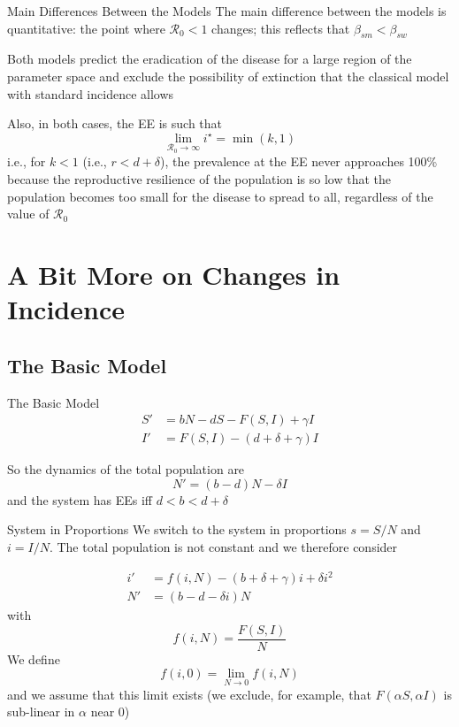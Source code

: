 \documentclass[aspectratio=169]{beamer}\usepackage[]{graphicx}\usepackage[]{xcolor}
\begin{document}
\begin{frame}{Main Differences Between the Models}
\bbullet The main difference between the models is quantitative: the point where $\mathcal{R}_0<1$ changes; this reflects that $\beta_{sm}<\beta_{sw}$

\bbullet Both models predict the eradication of the disease for a large region of the parameter space and exclude the possibility of extinction that the classical model with standard incidence allows

\bbullet Also, in both cases, the EE is such that 
\[
\lim_{\mathcal{R}_0\to\infty}i^{\star} = \min(k,1)
\]
i.e., for $k < 1$ (i.e., $r < d + \delta$), the prevalence at the EE never approaches 100\% because the reproductive resilience of the population is so low that the population becomes too small for the disease to spread to all, regardless of the value of $\mathcal{R}_0$
\end{frame}

\section{A Bit More on Changes in Incidence}

\subsection{The Basic Model}

\begin{frame}{The Basic Model}
\nocite{arino2010effect}
\begin{align}
S' &= bN-dS-F(S,I)+\gamma I \tag{13a} \\
I' &= F(S,I)-(d+\delta+\gamma) I \tag{13b}
\end{align}

\bbullet So the dynamics of the total population are
\[
N' = (b-d)N-\delta I
\]
and the system has EEs iff $d<b<d+\delta$
\end{frame}

\begin{frame}{System in Proportions}
\bbullet We switch to the system in proportions $s=S/N$ and $i=I/N$. The total population is not constant and we therefore consider

\begin{align}
i' &= f(i,N)-(b+\delta+\gamma)i+\delta i^2 \tag{14a}\label{sys:switch_JACCMC_prop_di} \\
N' &= (b-d-\delta i)N \label{sys:switch_JACCMC_prop_dN}\tag{14b}
\end{align}
with
\[
f(i,N) = \frac{F(S,I)}{N}
\]
\bbullet We define
\[
f(i,0)=\lim_{N\to 0}f(i,N)
\]
and we assume that this limit exists (we exclude, for example, that $F(\alpha S,\alpha I)$ is sub-linear in $\alpha$ near 0)
\end{frame}
\end{document}
